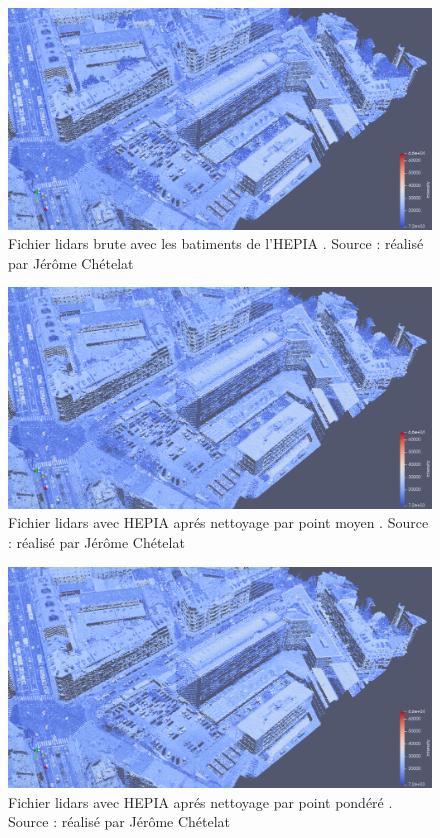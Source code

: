 \begin{figure}[htbp!]
    \centering
	\includegraphics[width=0.9\linewidth]{figures/filters/hepia_las.png}
	\caption{Fichier lidars brute avec les batiments de l'HEPIA . Source : réalisé par Jérôme Chételat}
	\label{fig:lidar_bef_filt}
\end{figure}

\begin{figure}[htbp!]
    \centering
	\includegraphics[width=0.9\linewidth]{figures/filters/hepia_filtered_avg_las.png}
	\caption{Fichier lidars avec HEPIA aprés nettoyage par point moyen . Source : réalisé par Jérôme Chételat}
	\label{fig:lidar_aft_filt_avg}
\end{figure}

\begin{figure}[htbp!]
    \centering
	\includegraphics[width=0.9\linewidth]{figures/filters/hepia_filtered_pond_las.png}
	\caption{Fichier lidars avec HEPIA aprés nettoyage par point pondéré . Source : réalisé par Jérôme Chételat}
	\label{fig:lidar_aft_filt_pond}
\end{figure}

